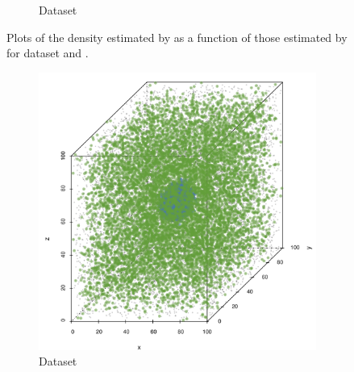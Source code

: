 \begin{figure}
\begin{subfigure}{0.3\textwidth}
				\caption{Dataset \baakmanThree}
				\label{fig:discussion:performance:mbevssambe:baakman3}
			\end{subfigure}	
			\caption{Plots of the density estimated by \sambe as a function of those estimated by \mbe for dataset %
				\ferdosiThree and %
				\baakmanThree.
			}
			\label{fig:discussion:performance:four:mbevssambe}
		\end{figure}

		\begin{figure}
			\centering
			\begin{subfigure}{0.23\textwidth}
				\centering
				\includegraphics[keepaspectratio=true, width=\textwidth, height=0.23\textheight]{discussion/img/ferdosi_1_abs_error_mbeSmallerThansambe}
				\caption{Dataset \ferdosiOne}
				\label{fig:discussion:performance:mbeLowerError:ferdosi1}
			\end{subfigure}
			\begin{subfigure}{0.23\textwidth}
				\centering

\end{subfigure}
\end{figure}
